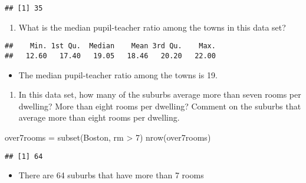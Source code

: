 \documentclass[
]{article}
\newenvironment{Shaded}{\begin{snugshade}}{\end{snugshade}}
\newcommand{\DecValTok}[1]{\textcolor[rgb]{0.00,0.00,0.81}{#1}}
\newcommand{\FunctionTok}[1]{\textcolor[rgb]{0.00,0.00,0.00}{#1}}
\newcommand{\NormalTok}[1]{#1}
\newcommand{\OtherTok}[1]{\textcolor[rgb]{0.56,0.35,0.01}{#1}}
\newcommand{\SpecialCharTok}[1]{\textcolor[rgb]{0.00,0.00,0.00}{#1}}
\providecommand{\tightlist}{%
  \setlength{\itemsep}{0pt}\setlength{\parskip}{0pt}}
\begin{document}
\begin{verbatim}
## [1] 35
\end{verbatim}

\begin{enumerate}
\def\labelenumi{(\alph{enumi})}
\setcounter{enumi}{5}
\tightlist
\item
  What is the median pupil-teacher ratio among the towns in this data
  set?
\end{enumerate}

\begin{Shaded}
\end{Shaded}

\begin{verbatim}
##    Min. 1st Qu.  Median    Mean 3rd Qu.    Max. 
##   12.60   17.40   19.05   18.46   20.20   22.00
\end{verbatim}

\begin{itemize}
\tightlist
\item
  The median pupil-teacher ratio among the towns is 19.
\end{itemize}

\begin{enumerate}
\def\labelenumi{(\alph{enumi})}
\setcounter{enumi}{7}
\tightlist
\item
  In this data set, how many of the suburbs average more than seven
  rooms per dwelling? More than eight rooms per dwelling? Comment on the
  suburbs that average more than eight rooms per dwelling.
\end{enumerate}

\begin{Shaded}
\begin{Highlighting}[]
\NormalTok{over7rooms }\OtherTok{=} \FunctionTok{subset}\NormalTok{(Boston, rm }\SpecialCharTok{\textgreater{}} \DecValTok{7}\NormalTok{)}
\FunctionTok{nrow}\NormalTok{(over7rooms)}
\end{Highlighting}
\end{Shaded}

\begin{verbatim}
## [1] 64
\end{verbatim}

\begin{itemize}
\tightlist
\item
  There are 64 suburbs that have more than 7 rooms
\end{itemize}
\end{document}
